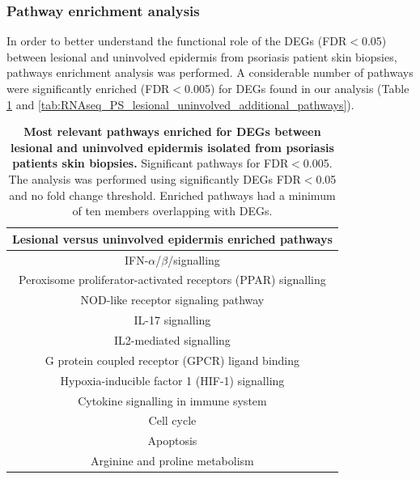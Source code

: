 \subsubsection{Pathway enrichment analysis}

In order to better understand the functional role of the DEGs (FDR$<$0.05) between lesional and uninvolved epidermis from psoriasis patient skin biopsies, pathways enrichment analysis was performed. A considerable number of pathways were significantly enriched (FDR$<$0.005) for DEGs found in our analysis (Table \ref{tab:RNAseq_PS_lesional_uninvolved_pathway_enrichment} and \ref{tab:RNAseq_PS_lesional_uninvolved_additional_pathways}). 


\begin{table}[htbp]
\centering
\begin{tabular}{@{}c}
\toprule
\textbf{Lesional versus uninvolved epidermis enriched pathways} \\
\midrule
\midrule
IFN-$\alpha$/$\beta$/signalling \\
Peroxisome proliferator-activated receptors (PPAR) signalling \\
NOD-like receptor signaling pathway \\
IL-17 signalling \\
IL2-mediated signalling \\
G protein coupled receptor (GPCR) ligand binding \\
Hypoxia-inducible factor 1 (HIF-1) signalling \\
Cytokine signalling in immune system \\
Cell cycle \\
Apoptosis \\
Arginine and proline metabolism \\
\bottomrule
\end{tabular}
\medskip %
\caption[Most relevant pathways enriched for DEGs between lesional and uninvolved epidermis isolated from psoriasis patients skin biopsies.]{\textbf{Most relevant pathways enriched for DEGs between lesional and uninvolved epidermis isolated from psoriasis patients skin biopsies.} Significant pathways for FDR$<$0.005. The analysis was performed using significantly DEGs FDR$<$0.05 and no fold change threshold. Enriched pathways had a minimum of ten members overlapping with DEGs.}
\label{tab:RNAseq_PS_lesional_uninvolved_pathway_enrichment}
\end{table}


